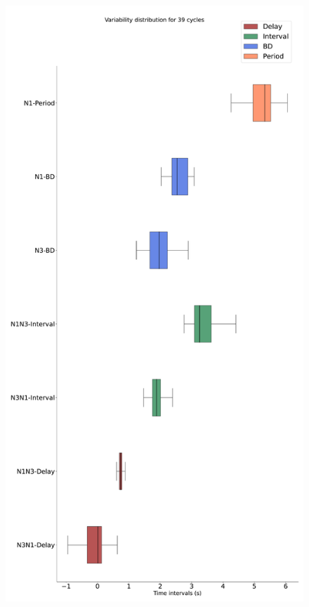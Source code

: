 \begin{figure}[htbp]
\begin{minipage}[b]{0.43\textwidth}
		\includegraphics[width=\textwidth]{./invariants/data/SUSSEX/CV1a_driven1/images/stim_cv1a1_boxplot.pdf}
	\end{minipage}
	\begin{minipage}[b]{0.55\textwidth}
		\centering

\end{minipage}
\end{figure}
